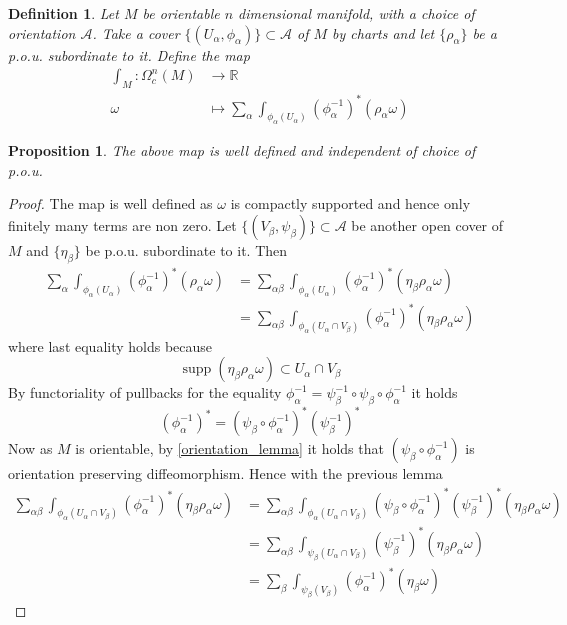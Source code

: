 \documentclass{article}
\numberwithin{theorem}{section}
\newtheorem{proposition}[theorem]{Proposition}
\newtheorem{definition}[theorem]{Definition}
\newcommand{\R}{\mathbb{R}}
\newcommand{\1}{\mathds{1}}
\DeclareMathOperator{\supp}{supp}
\begin{document}
\begin{definition}
    Let $M$ be orientable $n$ dimensional manifold, with a choice of orientation $\mathcal{A}$.  Take a cover $\{ (U_\alpha, \phi_\alpha ) \}  \subset \mathcal{A}$ of $M$ by charts and let $\{ \rho_\alpha \}$ be a p.o.u. subordinate to it. Define the map 
    \begin{align*}
         \int_M : \Omega_c^n(M) &\to \R  \\
     \omega &\mapsto  \sum_{\alpha} \int_{\phi_\alpha(U_\alpha)} (\phi_\alpha^{-1})^* (\rho_\alpha \omega)
    \end{align*}
    
\end{definition}
\begin{proposition}
    The above map is well defined and independent of choice of p.o.u.
\end{proposition}

\begin{proof}
    The map is well defined as $\omega$ is compactly supported and hence only finitely many terms are non zero. Let $\{ (V_\beta, \psi_\beta) \} \subset \mathcal{A}$ be another open cover of $M$ and $\{ \eta_\beta \}$ be p.o.u. subordinate to it. Then 
    \begin{align*}
        \sum_{\alpha} \int_{\phi_\alpha(U_\alpha)} (\phi_\alpha^{-1})^* (\rho_\alpha \omega) &= \sum_{\alpha \beta } \int_{\phi_\alpha(U_\alpha)} (\phi_\alpha^{-1})^* (\eta_\beta \rho_\alpha \omega)  \\
        &= \sum_{\alpha \beta } \int_{\phi_\alpha(U_\alpha \cap V_\beta)} (\phi_\alpha^{-1})^* (\eta_\beta \rho_\alpha \omega)
    \end{align*}
    where last equality holds because 
    \[ \supp (\eta_\beta \rho_\alpha \omega) \subset U_\alpha \cap V_\beta\] 
    By functoriality of pullbacks  for the equality $\phi_\alpha^{-1} = \psi_\beta^{-1} \circ \psi_\beta \circ \phi_\alpha^{-1}$ it holds 
    \[  (\phi_\alpha^{-1})^*=   (\psi_\beta \circ \phi_\alpha^{-1})^* (\psi_\beta^{-1})^*\]
    Now as $M$ is orientable, by \ref{orientation_lemma} it holds that $(\psi_\beta \circ \phi_\alpha^{-1})$ is orientation preserving diffeomorphism. Hence with the previous lemma 
    \begin{align*}
        \sum_{\alpha \beta } \int_{\phi_\alpha(U_\alpha \cap V_\beta)} (\phi_\alpha^{-1})^* (\eta_\beta \rho_\alpha \omega) &= \sum_{\alpha \beta } \int_{\phi_\alpha(U_\alpha \cap V_\beta)} (\psi_\beta \circ \phi_\alpha^{-1})^* (\psi_\beta^{-1})^* (\eta_\beta \rho_\alpha \omega)  \\
        &= \sum_{\alpha \beta } \int_{\psi_\beta(U_\alpha \cap V_\beta)} (\psi_\beta^{-1})^* (\eta_\beta \rho_\alpha \omega) \\
        &= \sum_{ \beta } \int_{\psi_\beta( V_\beta)} (\phi_\alpha^{-1})^* (\eta_\beta \omega)
    \end{align*}

\end{proof}
\end{document}
